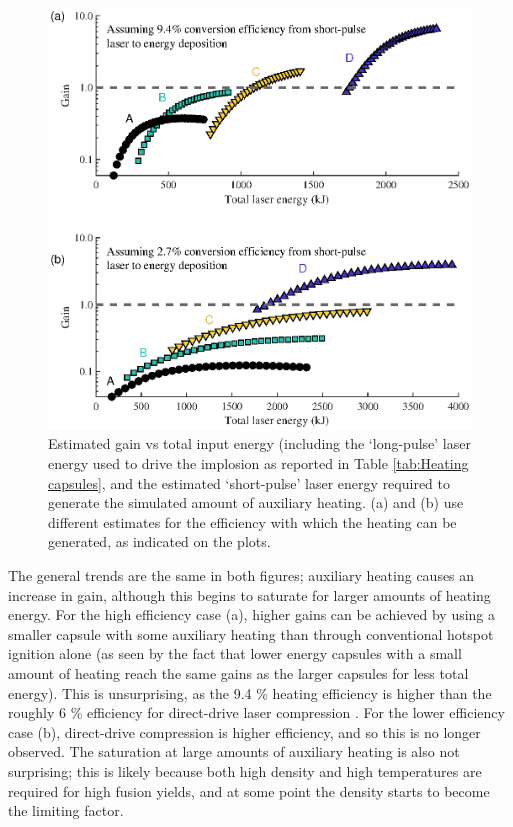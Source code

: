 \begin{figure}[ht]
\centering
\includegraphics{figures/FurtherSims/HeatingGain.eps}
\caption{Estimated gain vs total input energy (including the `long-pulse' laser energy used to drive the implosion as reported in Table \ref{tab:Heating capsules}, and the estimated `short-pulse' laser energy required to generate the simulated amount of auxiliary heating. (a) and (b) use different estimates for the efficiency with which the heating can be generated, as indicated on the plots.}
\label{fig:HeatedGain}
\end{figure}

The general trends are the same in both figures; auxiliary heating causes an increase in gain, although this begins to saturate for larger amounts of heating energy. For the high efficiency case (a), higher gains can be achieved by using a smaller capsule with some auxiliary heating than through conventional hotspot ignition alone (as seen by the fact that lower energy capsules with a small amount of heating reach the same gains as the larger capsules for less total energy). This is unsurprising, as the 9.4 \% heating efficiency is higher than the roughly 6 \% efficiency for direct-drive laser compression \cite{Campbell2017, Goncharov2016}. For the lower efficiency case (b), direct-drive compression is higher efficiency, and so this is no longer observed. The saturation at large amounts of auxiliary heating is also not surprising; this is likely because both high density and high temperatures are required for high fusion yields, and at some point the density starts to become the limiting factor.

